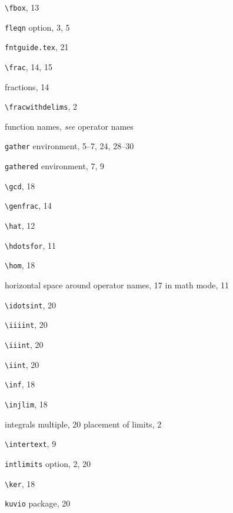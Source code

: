 \documentclass[leqno,titlepage,openany]{amsldoc}[1999/12/13]
\providecommand{\see}[2]{\textit{see} #1}
\begin{document}
\begin{theindex}
  \indexspace

  \item \verb*+\fbox+, 13
  \item \texttt{fleqn} option, 3, 5
  \item \texttt{fntguide.tex}, 21
  \item \verb*+\frac+, 14, 15
  \item fractions, 14
  \item \verb*+\fracwithdelims+, 2
  \item function names, \see{operator names}{17}

  \indexspace

  \item \texttt{gather} environment, 5--7, 24, 28--30
  \item \texttt{gathered} environment, 7, 9
  \item \verb*+\gcd+, 18
  \item \verb*+\genfrac+, 14

  \indexspace

  \item \verb*+\hat+, 12
  \item \verb*+\hdotsfor+, 11
  \item \verb*+\hom+, 18
  \item horizontal space
    \subitem around operator names, 17
    \subitem in math mode, 11

  \indexspace

  \item \verb*+\idotsint+, 20
  \item \verb*+\iiiint+, 20
  \item \verb*+\iiint+, 20
  \item \verb*+\iint+, 20
  \item \verb*+\inf+, 18
  \item \verb*+\injlim+, 18
  \item integrals
    \subitem multiple, 20
    \subitem placement of limits, 2
  \item \verb*+\intertext+, 9
  \item \texttt{intlimits} option, 2, 20

  \indexspace

  \item \verb*+\ker+, 18
  \item \texttt{kuvio} package, 20

  \indexspace


\end{theindex}
\end{document}
